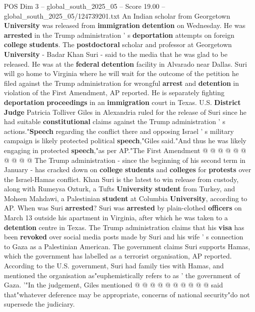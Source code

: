 \begin{textsample}{POS Dim 3 – global\_south\_2025\_05 – Score 19.00 – global\_south\_2025\_05/124739201.txt}  \label{ex:f3_pos_236}
An Indian scholar from Georgetown \textbf{University} was released from \textbf{immigration} \textbf{detention} on Wednesday.
He was \textbf{arrested} in the Trump administration ' s \textbf{deportation} attempts on foreign \textbf{college} \textbf{students}.
The \textbf{postdoctoral} scholar and professor at Georgetown \textbf{University} - Badar Khan Suri - said to the media that he was glad to be released.
He was at the \textbf{federal} \textbf{detention} facility in Alvarado near Dallas.
Suri will go home to Virginia where he will wait for the outcome of the petition he filed against the Trump administration for wrongful \textbf{arrest} and \textbf{detention} in violation of the First Amendment, AP reported.
He is separately fighting \textbf{deportation} \textbf{proceedings} in an \textbf{immigration} court in Texas.
U.S. \textbf{District} \textbf{Judge} Patricia Tolliver Giles in Alexandria ruled for the release of Suri since he had suitable \textbf{constitutional} claims against the Trump administration ' s actions."\textbf{Speech} regarding the conflict there and opposing Israel ' s military campaign is likely protected political \textbf{speech},"Giles said."And thus he was likely engaging in protected \textbf{speech},"as per AP."The First Amendment @ @ @ @ @ @ @ @ @ @ The Trump administration - since the beginning of his second term in January - has cracked down on \textbf{college} \textbf{students} and \textbf{colleges} for \textbf{protests} over the Israel-Hamas conflict.
Khan Suri is the latest to win release from custody, along with Rumeysa Ozturk, a Tufts \textbf{University} \textbf{student} from Turkey, and Mohsen Mahdawi, a Palestinian \textbf{student} at Columbia \textbf{University}, according to AP.
When was Suri \textbf{arrested}?
Suri was \textbf{arrested} by plain-clothed \textbf{officers} on March 13 outside his apartment in Virginia, after which he was taken to a \textbf{detention} centre in Texas.
The Trump administration claims that his \textbf{visa} has been \textbf{revoked} over social media posts made by Suri and his wife ' s connection to Gaza as a Palestinian American.
The government claims Suri supports Hamas, which the government has labelled as a terrorist organisation, AP reported.
According to the U.S. government, Suri had family ties with Hamas, and mentioned the organisation as"euphemistically refers to as ' the government of Gaza. '"In the judgement, Giles mentioned @ @ @ @ @ @ @ @ @ @ said that"whatever deference may be appropriate, concerns of national security"do not supersede the judiciary.

\end{textsample}
